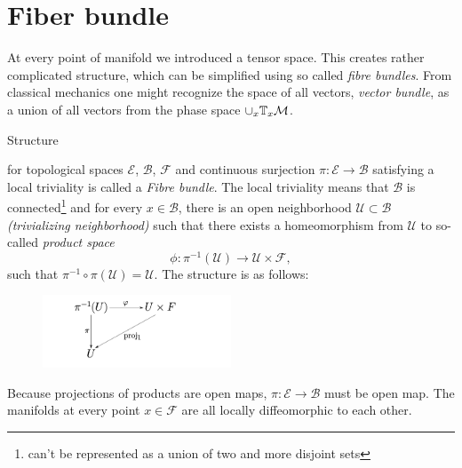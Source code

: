 \section{Fiber bundle}
\label{sec:bundleDef}
At every point of manifold we introduced a tensor space. This creates rather complicated structure, which can be simplified using so called \emph{fibre bundles}. From classical mechanics one might recognize the space of all vectors, \emph{vector bundle}, as a union of all vectors from the phase space $\cup_x\mathbb{T}_x\mathcal{M}$.
\begin{definition}
    Structure 
\begin{center}
\end{center}
    for topological spaces $\mathcal{E}$, $\mathcal{B}$, $\mathcal F$ and continuous surjection $\pi: \mathcal{E}\rightarrow \mathcal{B}$ satisfying a local triviality is called a \emph{Fibre bundle}. The local triviality means that $\mathcal{B}$ is connected\footnote{can't be represented as a union of two and more disjoint sets} and for every $x\in \mathcal{B}$, there is an open neighborhood $\mathcal{U}\subset \mathcal{B}$ \emph{(trivializing neighborhood)} such that there exists a homeomorphism from $\mathcal{U}$ to so-called \emph{product space}
    $$\phi: \pi^{-1}(\mathcal{U})\rightarrow \mathcal{U}\times \mathcal{F},$$
    such that $\pi^{-1}\circ \pi(\mathcal{U})=\mathcal{U}$.
    The structure is as follows: 
    \begin{figure}[H]
        \centering
        \includegraphics[width=0.5\textwidth]{../img/bundle.png}
    \end{figure}
\end{definition}
Because projections of products are open maps, $\pi: \mathcal{E}\rightarrow \mathcal{B}$ must be open map. The manifolds at every point $x\in \mathcal{F}$ are all locally diffeomorphic to each other.
